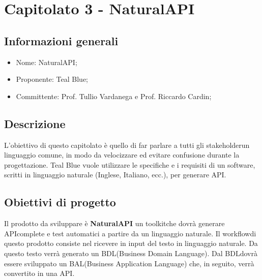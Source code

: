 \section{Capitolato 3 - NaturalAPI}
\subsection{Informazioni generali}
\begin{itemize}
	\item Nome: NaturalAPI;
	\item Proponente: Teal Blue;
	\item Committente: Prof. Tullio Vardanega e Prof. Riccardo Cardin;
\end{itemize}
\subsection{Descrizione}
L'obiettivo di questo capitolato è quello di far parlare a tutti gli stakeholder\glosp un linguaggio comune, in modo da velocizzare ed evitare confusione durante la progettazione. Teal Blue vuole utilizzare le specifiche e i requisiti di un software, scritti in linguaggio naturale (Inglese, Italiano, ecc.), per generare API\glo.

\subsection{Obiettivi di progetto}
Il prodotto da sviluppare è \textbf{NaturalAPI} un toolkit\glosp che dovrà generare API\glosp complete e test automatici a partire da un linguaggio naturale. Il workflow\glosp di questo prodotto consiste nel ricevere in input del testo in linguaggio naturale. Da questo testo verrà generato un BDL\glosp (Business Domain Language). Dal BDL\glosp dovrà essere sviluppato un BAL\glosp (Business Application Language) che, in seguito, verrà convertito in una API\glo.

